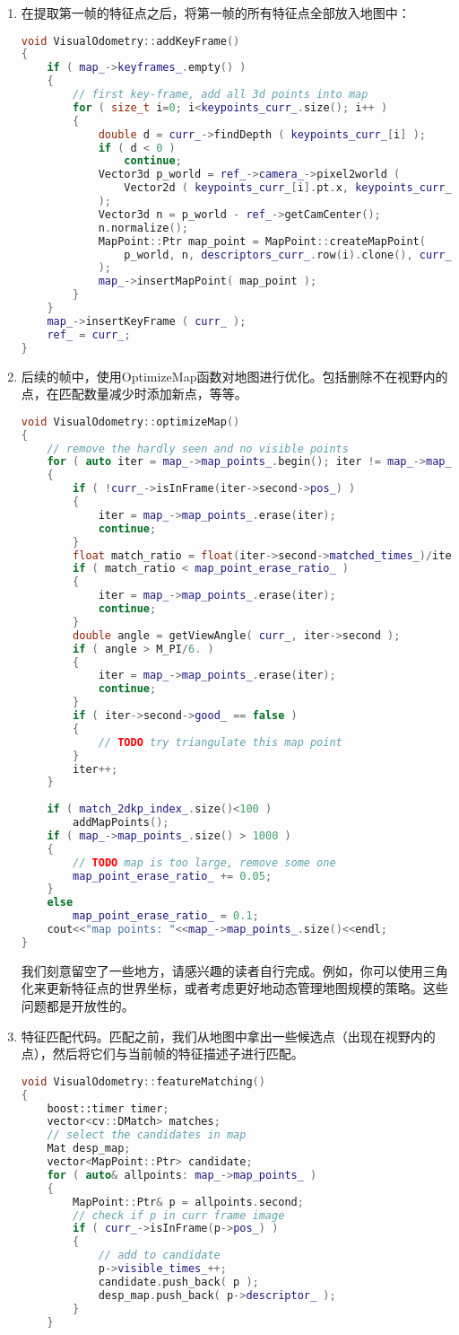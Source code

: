 \begin{enumerate}
	\item 在提取第一帧的特征点之后，将第一帧的所有特征点全部放入地图中：
\begin{lstlisting}[language=c++]
void VisualOdometry::addKeyFrame()
{
	if ( map_->keyframes_.empty() )
	{
		// first key-frame, add all 3d points into map
		for ( size_t i=0; i<keypoints_curr_.size(); i++ )
		{
			double d = curr_->findDepth ( keypoints_curr_[i] );
			if ( d < 0 ) 
				continue;
			Vector3d p_world = ref_->camera_->pixel2world (
				Vector2d ( keypoints_curr_[i].pt.x, keypoints_curr_[i].pt.y ), curr_->T_c_w_, d
			);
			Vector3d n = p_world - ref_->getCamCenter();
			n.normalize();
			MapPoint::Ptr map_point = MapPoint::createMapPoint(
				p_world, n, descriptors_curr_.row(i).clone(), curr_.get()
			);
			map_->insertMapPoint( map_point );
		}
	}
	map_->insertKeyFrame ( curr_ );
	ref_ = curr_;
}
\end{lstlisting}
	\item 后续的帧中，使用OptimizeMap函数对地图进行优化。包括删除不在视野内的点，在匹配数量减少时添加新点，等等。
\begin{lstlisting}[language=c++]
void VisualOdometry::optimizeMap()
{
	// remove the hardly seen and no visible points 
	for ( auto iter = map_->map_points_.begin(); iter != map_->map_points_.end(); )
	{
		if ( !curr_->isInFrame(iter->second->pos_) )
		{
			iter = map_->map_points_.erase(iter);
			continue;
		}
		float match_ratio = float(iter->second->matched_times_)/iter->second->visible_times_;
		if ( match_ratio < map_point_erase_ratio_ )
		{
			iter = map_->map_points_.erase(iter);
			continue;
		}
		double angle = getViewAngle( curr_, iter->second );
		if ( angle > M_PI/6. )
		{
			iter = map_->map_points_.erase(iter);
			continue;
		}
		if ( iter->second->good_ == false )
		{
			// TODO try triangulate this map point 
		}
		iter++;
	}
	
	if ( match_2dkp_index_.size()<100 )
		addMapPoints();
	if ( map_->map_points_.size() > 1000 )  
	{
		// TODO map is too large, remove some one 
		map_point_erase_ratio_ += 0.05;
	}
	else 
		map_point_erase_ratio_ = 0.1;
	cout<<"map points: "<<map_->map_points_.size()<<endl;
}
\end{lstlisting}
	我们刻意留空了一些地方，请感兴趣的读者自行完成。例如，你可以使用三角化来更新特征点的世界坐标，或者考虑更好地动态管理地图规模的策略。这些问题都是开放性的。

	\item 特征匹配代码。匹配之前，我们从地图中拿出一些候选点（出现在视野内的点），然后将它们与当前帧的特征描述子进行匹配。
\begin{lstlisting}[language=c++]
void VisualOdometry::featureMatching()
{
	boost::timer timer;
	vector<cv::DMatch> matches;
	// select the candidates in map 
	Mat desp_map;
	vector<MapPoint::Ptr> candidate;
	for ( auto& allpoints: map_->map_points_ )
	{
		MapPoint::Ptr& p = allpoints.second;
		// check if p in curr frame image 
		if ( curr_->isInFrame(p->pos_) )
		{
			// add to candidate 
			p->visible_times_++;
			candidate.push_back( p );
			desp_map.push_back( p->descriptor_ );
		}
	}
	

\end{lstlisting}
\end{enumerate}
